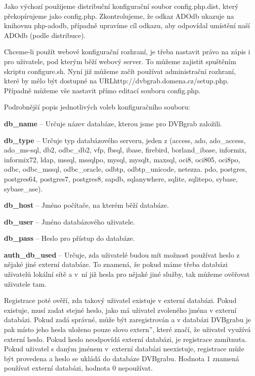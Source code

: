 Jako výchozí použijeme distribuční konfigurační soubor config.php.dist, který překopírujeme jako config.php.
Zkontrolujeme, že odkaz ADOdb ukazuje na knihovnu php-adodb, případně upravíme cíl odkazu, aby odpovídal umístění naší ADOdb (podle distribuce).

Chceme-li použít webové konfigurační rozhraní, je třeba nastavit právo na zápis i pro uživatele, pod kterým běží webový server. To můžeme zajistit spuštěním skriptu configure.sh. Nyní již můžeme začít používat administrační rozhraní, které by mělo být dostupné na URL\linebreak[4] http://dvbgrab.domena.cz/setup.php. Případně můžeme vše nastavit přímo editací souboru config.php.

Podrobnější popis jednotlivých voleb konfiguračního souboru:
\bitem
\item\textbf{db\_name} -- Určuje název databáze, kterou jsme pro DVBgrab založili.
\item\textbf{db\_type} -- Určuje typ databázového serveru, jeden z (access, ado, ado\_access, ado\_ms-sql, db2, odbc\_db2, vfp, fbsql, ibase, firebird, borland\_ibase, informix, informix72, ldap, mssql, mssqlpo, mysql, mysqlt, maxsql, oci8, oci805, oci8po, odbc, odbc\_mssql, odbc\_oracle, odbtp, odbtp\_unicode, netezza. pdo, postgres, postgres64, postgres7, postgres8, sapdb, sqlanywhere, sqlite, sqlitepo, sybase, sybase\_ase).
\item\textbf{db\_host} -- Jméno počítače, na kterém běží databáze.
\item\textbf{db\_user} -- Jméno databázového uživatele.
\item\textbf{db\_pass} -- Heslo pro přístup do databáze.
\item\textbf{auth\_db\_used} -- Určuje, zda uživatelé budou mít možnost používat heslo z nějaké jiné externí databáze. To znamená, že pokud máme třeba databázi uživatelů lokální sítě a v~ní již hesla pro nějaké jiné služby, tak můžeme ověřovat uživatele tam.

Registrace poté ověří, zda takový uživatel existuje v externí databázi. Pokud existuje, musí zadat stejné heslo, jako má uživatel zvoleného jména v externí databázi. Pokud zadá správné, může být zaregistrován a v databázi DVBgrabu je pak místo jeho hesla uloženo pouze slovo \quotedblbase extern'', které značí, že uživatel využívá externí heslo. Pokud heslo neodpovídá externí databázi, je registrace zamítnuta. Pokud uživatel s daným jménem v~externí databázi neexistuje, registrace může být provedena a heslo se ukládá do databáze DVBgrabu. Hodnota 1 znamená používat externí databázi, hodnota 0 nepoužívat.

